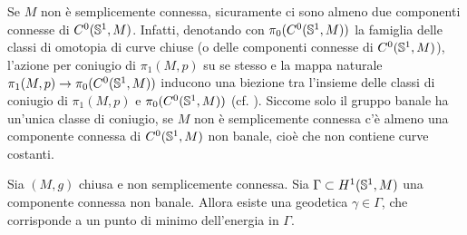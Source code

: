 Se \(M\) non è semplicemente connessa, sicuramente ci sono almeno due componenti connesse di \(C^0(\mathbb{S}^1,M)\). Infatti, denotando con \(\pi_0(C^0(\mathbb{S}^1,M))\) la famiglia delle classi di omotopia di curve chiuse (o delle componenti connesse di \(C^0(\mathbb{S}^1,M)\)), l'azione per coniugio di \(\pi_1(M,p)\) su se stesso e la mappa naturale \(\pi_1(M,p) \to \pi_0(C^0(\mathbb{S}^1,M))\) inducono una biezione tra l'insieme delle classi di coniugio di \(\pi_1(M,p)\) e \(\pi_0(C^0(\mathbb{S}^1,M))\) (cf. \cite[Proposition~4A.2]{hatcher2000algebraic}). Siccome solo il gruppo banale ha un'unica classe di coniugio, se \(M\) non è semplicemente connessa c'è almeno una componente connessa di \(C^0(\mathbb{S}^1,M)\) non banale, cioè che non contiene curve costanti.

\begin{teo}[Hadamard, 1898]\label{teo: minimizzazione energia}
	Sia \((M,g)\) chiusa e non semplicemente connessa. Sia \(\Gamma \subset H^1(\mathbb{S}^1,M)\) una componente connessa non banale. Allora esiste una geodetica \(\gamma \in \Gamma\), che corrisponde a un punto di minimo dell'energia in \(\Gamma\).
\end{teo}
